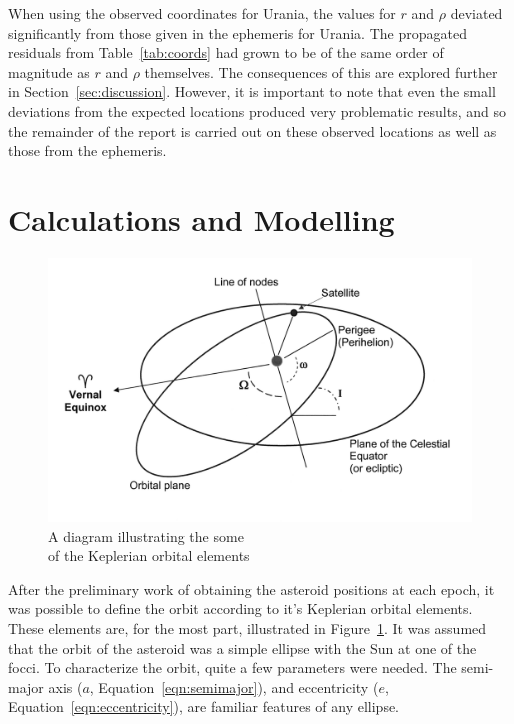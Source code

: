 \documentclass[a4paper,12pt]{article}
\begin{document}
When using the observed coordinates for Urania, the values for $r$ and $\rho$ deviated significantly from those given in the ephemeris for Urania. The propagated residuals from Table~\ref{tab:coords} had grown to be of the same order of magnitude as $r$ and $\rho$ themselves. The consequences of this are explored further in Section~\ref{sec:discussion}. However, it is important to note that even the small deviations from the expected locations produced very problematic results, and so the remainder of the report is carried out on these observed locations as well as those from the ephemeris.


\section{Calculations and Modelling}
\label{sec:calc}

\begin{figure}
\includegraphics[scale = 0.12]{orbitalelements2.png}
\caption{A diagram illustrating the some \\of the Keplerian orbital elements \citep{elements}}
\label{fig:elements}
\end{figure}

After the preliminary work of obtaining the asteroid positions at each epoch, it was possible to define the orbit according to it's Keplerian orbital elements. These elements are, for the most part, illustrated in Figure~\ref{fig:elements}. It was assumed that the orbit of the asteroid was a simple ellipse with the Sun at one of the focci. To characterize the orbit, quite a few parameters were needed. The semi-major axis ($a$, Equation~\ref{eqn:semimajor}), and eccentricity ($e$, Equation~\ref{eqn:eccentricity}), are familiar features of any ellipse. 
\end{document}
